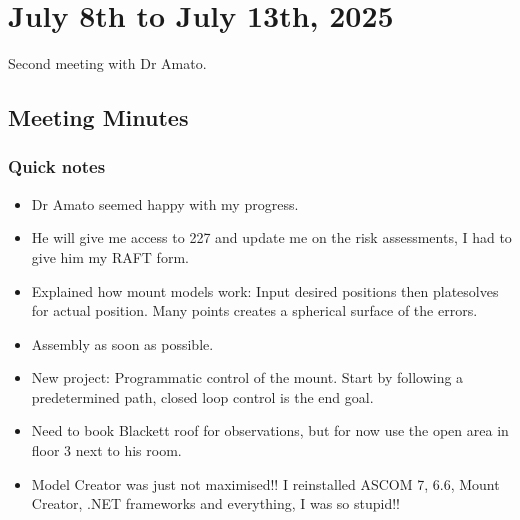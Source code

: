 \documentclass[../main.tex]{subfiles}
\begin{document}
\chapter{July 8th to July 13th, 2025}
Second meeting with Dr Amato.
\section{Meeting Minutes}
\subsection{Quick notes}
\begin{itemize}
    \item Dr Amato seemed happy with my progress.
    \item He will give me access to 227 and update me on the risk assessments, I had to give him my RAFT form.
    \item Explained how mount models work: Input desired positions then platesolves for actual position. Many points creates a spherical surface of the errors.
    \item Assembly as soon as possible.
    \item New project: Programmatic control of the mount. Start by following a predetermined path, closed loop control is the end goal.
    \item Need to book Blackett roof for observations, but for now use the open area in floor 3 next to his room.
    \item Model Creator was just not maximised!! I reinstalled ASCOM 7, 6.6, Mount Creator, .NET frameworks and everything, I was so stupid!!
\end{itemize}
\end{document}
